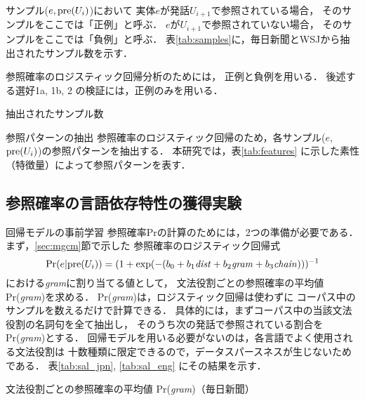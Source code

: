 \documentclass[japanese]{jnlp_1.3e}
\renewcommand{\paragraph}{}
\begin{document}
サンプル($e, {\rm pre}(U_i)$)において
実体$e$が発話$U_{i+1}$で参照されている場合，
そのサンプルをここでは「正例」と呼ぶ．
$e$が$U_{i+1}$で参照されていない場合，
そのサンプルをここでは「負例」と呼ぶ．
表\ref{tab:samples}に，毎日新聞とWSJから抽出されたサンプル数を示す．

参照確率のロジスティック回帰分析のためには，
正例と負例を用いる．
後述する選好1a, 1b, 2 の検証には，正例のみを用いる．

\begin{table}[b]
\caption{抽出されたサンプル数}
\label{tab:samples}

\end{table}



\paragraph{参照パターンの抽出}
参照確率のロジスティック回帰のため，各サンプル($e$, ${\rm pre}(U_i)$)の参照パターンを抽出する．
本研究では，表\ref{tab:features} に示した素性（特徴量）によって参照パターンを表す．





\subsection{参照確率の言語依存特性の獲得実験}
\label{sec:verify_salience}

\paragraph{回帰モデルの事前学習}
参照確率Prの計算のためには，2つの準備が必要である．
まず，\ref{sec:mgcm}節で示した
参照確率のロジスティック回帰式
$${\rm Pr}(e|{\rm pre}(U_i))=(1+{\rm exp}(-(b_0+b_1{\it dist}+b_2{\it gram}+b_3{\it chain})))^{-1}$$
における{\it gram}に割り当てる値として，
文法役割ごとの参照確率の平均値Pr({\it gram})を求める．
Pr({\it gram})は，ロジスティック回帰は使わずに
コーパス中のサンプルを数えるだけで計算できる．
具体的には，まずコーパス中の当該文法役割の名詞句を全て抽出し，
そのうち次の発話で参照されている割合をPr({\it gram})とする．
回帰モデルを用いる必要がないのは，各言語でよく使用される文法役割は
十数種類に限定できるので，データスパースネスが生じないためである．
表\ref{tab:sal_jpn}, \ref{tab:sal_eng} にその結果を示す．

\begin{table}[b]
\caption{文法役割ごとの参照確率の平均値 Pr({\it gram})（毎日新聞）}
\label{tab:sal_jpn}

\end{table}
\end{document}
